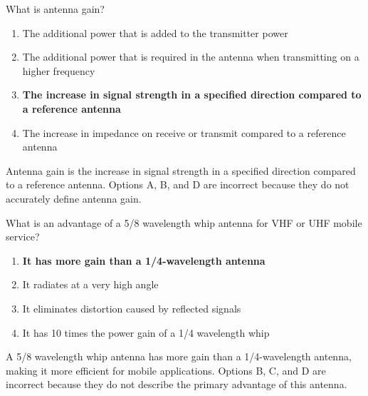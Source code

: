 
\begin{tcolorbox}[colback=gray!10!white,colframe=black!75!black,title={T9A11}]
What is antenna gain?
\begin{enumerate}[label=\Alph*),noitemsep]
    \item The additional power that is added to the transmitter power
    \item The additional power that is required in the antenna when transmitting on a higher frequency
    \item \textbf{The increase in signal strength in a specified direction compared to a reference antenna}
    \item The increase in impedance on receive or transmit compared to a reference antenna
\end{enumerate}
\end{tcolorbox}
Antenna gain is the increase in signal strength in a specified direction compared to a reference antenna. Options A, B, and D are incorrect because they do not accurately define antenna gain.


\begin{tcolorbox}[colback=gray!10!white,colframe=black!75!black,title={T9A12}]
What is an advantage of a 5/8 wavelength whip antenna for VHF or UHF mobile service?
\begin{enumerate}[label=\Alph*),noitemsep]
    \item \textbf{It has more gain than a 1/4-wavelength antenna}
    \item It radiates at a very high angle
    \item It eliminates distortion caused by reflected signals
    \item It has 10 times the power gain of a 1/4 wavelength whip
\end{enumerate}
\end{tcolorbox}
A 5/8 wavelength whip antenna has more gain than a 1/4-wavelength antenna, making it more efficient for mobile applications. Options B, C, and D are incorrect because they do not describe the primary advantage of this antenna.



